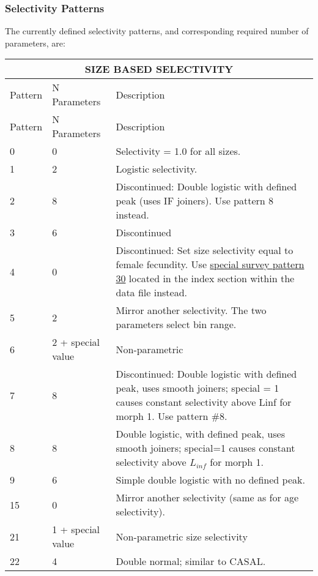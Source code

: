 \subsubsection{Selectivity Patterns}
The currently defined selectivity patterns, and corresponding required number of parameters, are:


\begin{longtable}{p{2cm} p{3cm} p{10cm}}
	\multicolumn{3}{c}{SIZE BASED SELECTIVITY}\Bstrut\\	
	\endfirsthead

	\hline
	Pattern & N Parameters & Description \Tstrut\Bstrut\\
	\hline
	\endhead

	\hline
	\endfoot
	\endlastfoot

	\hline
		
	Pattern & N Parameters & Description \Tstrut\Bstrut\\
	\hline
	0 \Tstrut& 0 & Selectivity = 1.0 for all sizes. \\
	1 \Tstrut& 2 & Logistic selectivity.\\
	2 \Tstrut& 8 & Discontinued: Double logistic with defined peak (uses IF joiners). Use pattern 8 instead.\\
	3 \Tstrut& 6 & Discontinued \\
	4 \Tstrut& 0 & Discontinued: Set size selectivity equal to female fecundity. Use \hyperlink{SpecialSurvey}{special survey pattern 30} located in the index section within the data file instead.\\
	5 \Tstrut& 2 & Mirror another selectivity. The two parameters select bin range.\\
	6 \Tstrut& 2 + special value & Non-parametric \\
	7 \Tstrut& 8 & Discontinued: Double logistic with defined peak, uses smooth joiners; special = 1 causes constant selectivity above Linf for morph 1.  Use pattern \#8.\\
	8 \Tstrut& 8 & Double logistic, with defined peak, uses smooth joiners; special=1 causes constant selectivity above $L_{inf}$ for morph 1.  \\
	9 \Tstrut& 6 & Simple double logistic with no defined peak.\\
	15 \Tstrut& 0 & Mirror another selectivity (same as for age selectivity).\\
	21 \Tstrut& 1 + special value  & Non-parametric size selectivity\\
	22 \Tstrut& 4 & Double normal; similar to CASAL.\\

\end{longtable}
